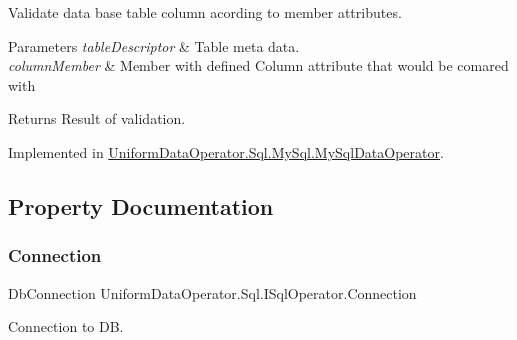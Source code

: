 Validate data base table column acording to member attributes. 


\begin{DoxyParams}{Parameters}
{\em table\+Descriptor} & Table meta data.\\
\hline
{\em column\+Member} & Member with defined Column attribute that would be comared with \\
\hline
\end{DoxyParams}
\begin{DoxyReturn}{Returns}
Result of validation.
\end{DoxyReturn}


Implemented in \mbox{\hyperlink{class_uniform_data_operator_1_1_sql_1_1_my_sql_1_1_my_sql_data_operator_a233ab791c68b93aded97bfd9986767e8}{Uniform\+Data\+Operator.\+Sql.\+My\+Sql.\+My\+Sql\+Data\+Operator}}.



\subsection{Property Documentation}
\mbox{\label{interface_uniform_data_operator_1_1_sql_1_1_i_sql_operator_a99f034a986828e96955e3187cdfb28da}} 
\subsubsection{\texorpdfstring{Connection}{Connection}}
{\footnotesize\ttfamily Db\+Connection Uniform\+Data\+Operator.\+Sql.\+I\+Sql\+Operator.\+Connection\hspace{0.3cm}{\ttfamily [get]}}



Connection to DB. 

\mbox{\label{interface_uniform_data_operator_1_1_sql_1_1_i_sql_operator_a55b7f28ed4ab20f124e67e2d447f8b40}} 
